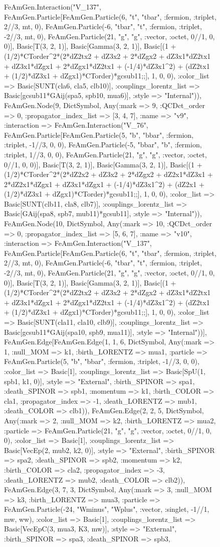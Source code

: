 \documentclass{revtex4}
\begin{document}
\begin{figure}[!htb]
\begin{center}
{FeAmGen.Interaction("V_137", FeAmGen.Particle[FeAmGen.Particle(6, "t", "tbar", :fermion, :triplet, 2//3, mt, 0), FeAmGen.Particle(-6, "tbar", "t", :fermion, :triplet, -2//3, mt, 0), FeAmGen.Particle(21, "g", "g", :vector, :octet, 0//1, 0, 0)], Basic[T(3, 2, 1)], Basic[Gamma(3, 2, 1)], Basic[(1 + (1/2)*CTorder^2*(2*dZ2tx2 + dZ3x2 + 2*dZgx2 + dZ3x1*dZ2tx1 + dZ3x1*dZgx1 + 2*dZgx1*dZ2tx1 + (-1/4)*dZ3x1^2) + (dZ2tx1 + (1/2)*dZ3x1 + dZgx1)*CTorder)*gcsub11;;], 1, 0, 0), :color_list => Basic[SUNT(cla6, cla5, clb10)], :couplings_lorentz_list => Basic[gcsub11*GAij(spa5, spb10, mua6)], :style => "Internal")), FeAmGen.Node(9, Dict{Symbol, Any}(:mark => 9, :QCDct_order => 0, :propagator_index_list => [3, 4, 7], :name => "v9", :interaction => FeAmGen.Interaction("V_76", FeAmGen.Particle[FeAmGen.Particle(5, "b", "bbar", :fermion, :triplet, -1//3, 0, 0), FeAmGen.Particle(-5, "bbar", "b", :fermion, :triplet, 1//3, 0, 0), FeAmGen.Particle(21, "g", "g", :vector, :octet, 0//1, 0, 0)], Basic[T(3, 2, 1)], Basic[Gamma(3, 2, 1)], Basic[(1 + (1/2)*CTorder^2*(2*dZ2x2 + dZ3x2 + 2*dZgx2 + dZ2x1*dZ3x1 + 2*dZ2x1*dZgx1 + dZ3x1*dZgx1 + (-1/4)*dZ3x1^2) + (dZ2x1 + (1/2)*dZ3x1 + dZgx1)*CTorder)*gcsub11;;], 1, 0, 0), :color_list => Basic[SUNT(clb11, cla8, clb7)], :couplings_lorentz_list => Basic[GAij(spa8, spb7, mub11)*gcsub11], :style => "Internal")), FeAmGen.Node(10, Dict{Symbol, Any}(:mark => 10, :QCDct_order => 0, :propagator_index_list => [5, 6, 7], :name => "v10", :interaction => FeAmGen.Interaction("V_137", FeAmGen.Particle[FeAmGen.Particle(6, "t", "tbar", :fermion, :triplet, 2//3, mt, 0), FeAmGen.Particle(-6, "tbar", "t", :fermion, :triplet, -2//3, mt, 0), FeAmGen.Particle(21, "g", "g", :vector, :octet, 0//1, 0, 0)], Basic[T(3, 2, 1)], Basic[Gamma(3, 2, 1)], Basic[(1 + (1/2)*CTorder^2*(2*dZ2tx2 + dZ3x2 + 2*dZgx2 + dZ3x1*dZ2tx1 + dZ3x1*dZgx1 + 2*dZgx1*dZ2tx1 + (-1/4)*dZ3x1^2) + (dZ2tx1 + (1/2)*dZ3x1 + dZgx1)*CTorder)*gcsub11;;], 1, 0, 0), :color_list => Basic[SUNT(cla11, cla10, clb9)], :couplings_lorentz_list => Basic[gcsub11*GAij(spa10, spb9, mua11)], :style => "Internal"))], FeAmGen.Edge[FeAmGen.Edge(1, 1, 6, Dict{Symbol, Any}(:mark => 1, :null_MOM => k1, :birth_LORENTZ => mua1, :particle => FeAmGen.Particle(5, "b", "bbar", :fermion, :triplet, -1//3, 0, 0), :color_list => Basic[1], :couplings_lorentz_list => Basic[SpU(1, spb1, k1, 0)], :style => "External", :birth_SPINOR => spa1, :death_SPINOR => spb1, :momentum => k1, :birth_COLOR => cla1, :propagator_index => -1, :death_LORENTZ => mub1, :death_COLOR => clb1)), FeAmGen.Edge(2, 2, 5, Dict{Symbol, Any}(:mark => 2, :null_MOM => k2, :birth_LORENTZ => mua2, :particle => FeAmGen.Particle(21, "g", "g", :vector, :octet, 0//1, 0, 0), :color_list => Basic[1], :couplings_lorentz_list => Basic[VecEp(2, mub2, k2, 0)], :style => "External", :birth_SPINOR => spa2, :death_SPINOR => spb2, :momentum => k2, :birth_COLOR => cla2, :propagator_index => -3, :death_LORENTZ => mub2, :death_COLOR => clb2)), FeAmGen.Edge(3, 7, 3, Dict{Symbol, Any}(:mark => 3, :null_MOM => k3, :birth_LORENTZ => mua3, :particle => FeAmGen.Particle(-24, "Wminus", "Wplus", :vector, :singlet, -1//1, mw, ww), :color_list => Basic[1], :couplings_lorentz_list => Basic[VecEpC(3, mua3, K3, mw)], :style => "External", :birth_SPINOR => spa3, :death_SPINOR => spb3, }
\end{center}
\end{figure}
\end{document}
